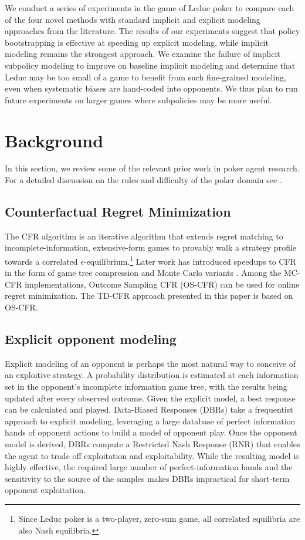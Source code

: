 \documentclass{aamas2013}
\begin{document}
We conduct a series of experiments in the game of Leduc poker to compare each of the four novel methods with standard implicit and explicit modeling approaches from the literature. The results of our experiments suggest that policy bootstrapping is effective at speeding up explicit modeling, while implicit modeling remains the strongest approach. We examine the failure of implicit subpolicy modeling to improve on baseline implicit modeling and determine that Leduc may be too small of a game to benefit from such fine-grained modeling, even when systematic biases are hand-coded into opponents. We thus plan to run future experiments on larger games where subpolicies may be more useful.


\section{Background}
In this section, we review some of the relevant prior work in poker agent research. For a detailed discussion on the rules and difficulty of the poker domain see \cite{billings2002challenge}.

    \subsection{Counterfactual Regret Minimization}
    The CFR algorithm \cite{cfr} is an iterative algorithm that extends regret matching \cite{regretmatching} to incomplete-information, extensive-form games to provably walk a strategy profile towards a correlated $\epsilon$-equilibrium.\footnote{Since Leduc poker is a two-player, zero-sum game, all correlated equilibria are also Nash equilibria.} Later work has introduced speedups to CFR in the form of game tree compression \cite{pcs} and Monte Carlo variants \cite{mccfr}. Among the MC-CFR implementations, Outcome Sampling CFR (OS-CFR) can be used for online regret minimization. The TD-CFR approach presented in this paper is based on OS-CFR.
    
    \subsection{Explicit opponent modeling}
    Explicit modeling of an opponent is perhaps the most natural way to conceive of an exploitive strategy. A probability distribution is estimated at each information set in the opponent's incomplete information game tree, with the results being updated after every observed outcome. Given the explicit model, a best response can be calculated and played. Data-Biased Responses (DBRs) \cite{dbr} take a frequentist approach to explicit modeling, leveraging a large database of perfect information hands of opponent actions to build a model of opponent play. Once the opponent model is derived, DBRs compute a Restricted Nash Response (RNR) \cite{rnr} that enables the agent to trade off exploitation and exploitability. While the resulting model is highly effective, the required large number of perfect-information hands and the sensitivity to the source of the samples makes DBRs impractical for short-term opponent exploitation.
\end{document}
